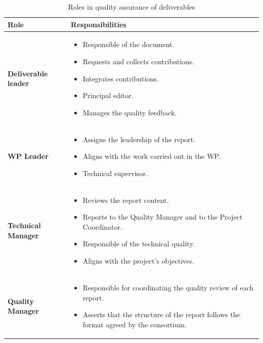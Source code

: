 \documentclass[a4paper,11pt]{article}
\begin{document}
{
\def\arraystretch{1.5}
\begin{table}[htb]
\caption{Roles in quality assurance of deliverables}
\label{tab:roles}
    \begin{tabular}{| p{3.5cm} | p{11.5cm} |}   
        \hline
        \rowcolor[gray]{0.8}
        \textbf{Role} & \textbf{Responsibilities} \\ \hline
        \textbf{Deliverable leader} &
        \begin{itemize}[nolistsep]
            \item Responsible of the document.
            \item Requests and collects contributions.
            \item Integrates contributions.
            \item Principal editor.
            \item Manages the quality feedback.
        \end{itemize}
        \\ \hline

        \textbf{WP Leader} & 
        \begin{itemize}[nolistsep]
            \item Assigns the leadership of the report.
            \item Aligns with the work carried out in the WP.
            \item Technical supervisor.
        \end{itemize}
         \\ \hline

        \textbf{Technical Manager} & 
        \begin{itemize}[nolistsep]
            \item Reviews the report content.
            \item Reports to the Quality Manager and to the Project Coordinator.
            \item Responsible of the technical quality.
            \item Aligns with the project's objectives.
        \end{itemize}
        \\ \hline
        
        \textbf{Quality Manager} & 
        \begin{itemize}[nolistsep]
            \item Responsible for coordinating the quality review of each report.
            \item Asserts that the structure of the report follows the format agreed by the consortium.
        \end{itemize}
        \\ \hline        
        
    \end{tabular}
\end{table}
}
\end{document}
